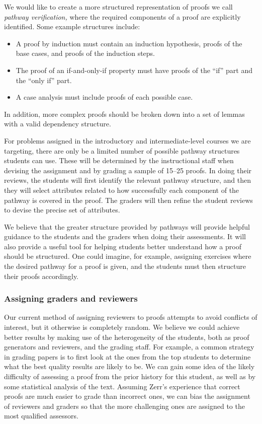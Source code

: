\documentclass[12pt]{article}
\begin{document}
We would like to
create a more structured representation of proofs we call {\em pathway
  verification,}  where the required components of a proof are
explicitly identified.  Some example structures include:
\begin{itemize}
\item A proof by induction must contain an induction hypothesis,
  proofs of the base cases, and proofs of the induction steps.
\item The proof of an if-and-only-if property must have proofs of the
  ``if'' part and the ``only if'' part.
\item A case analysis must include proofs of each possible case.
\end{itemize}
In addition, more complex proofs should be broken down into a set of
lemmas with a valid dependency structure.

For problems assigned in the introductory and intermediate-level
courses we are targeting, there are only be a limited number of
possible pathway structures students can use.  These will be
determined by the instructional staff when devising the assignment and
by grading a sample of 15--25 proofs.  In doing their reviews, the
students will first identify the relevant pathway structure, and then
they will select attributes related to how successfully each component
of the pathway is covered in the proof.  The graders will then refine
the student reviews to devise the precise set of attributes.

We believe that the greater structure provided by pathways will
provide helpful guidance to the students and the graders when doing
their assessments.  It will also provide a useful tool for helping
students better understand how a proof should be structured.  One
could imagine, for example, assigning exercises where the
desired pathway for a proof is given, and the students must
then structure their proofs accordingly.

\subsubsection*{Assigning graders and reviewers}

Our current method of assigning reviewers to proofs attempts to avoid
conflicts of interest, but it otherwise is completely random.  We
believe we could achieve better results by making use of the
heterogeneity of the students, both as proof generators and reviewers,
and the grading staff.  For example, a common strategy in grading
papers is to first look at the ones from the top students to determine
what the best quality results are likely to be.  We can gain some idea
of the likely difficulty of assessing a proof from the prior history
for this student, as well as by some statistical analysis of the
text.  Assuming Zerr's experience that correct proofs are much easier
to grade than incorrect ones, we can bias the assignment of reviewers
and graders so that the more challenging ones are assigned to the
most qualified assessors.
\end{document}
